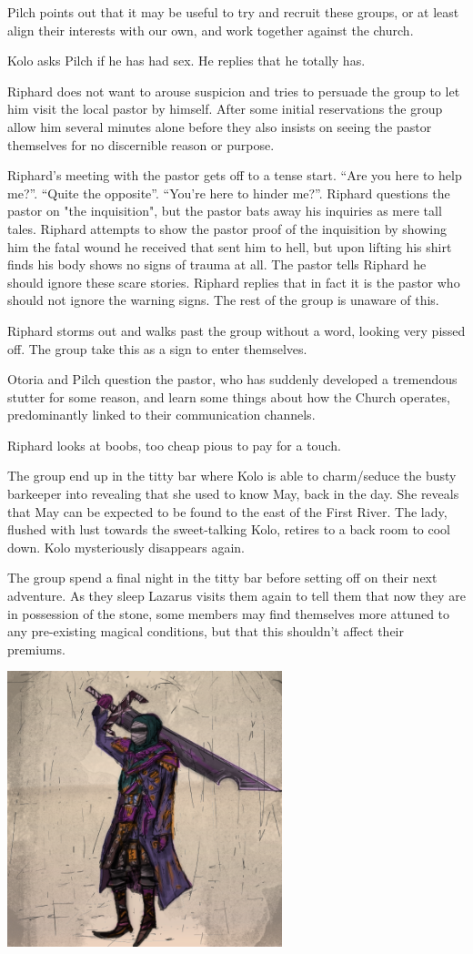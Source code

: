 Pilch points out that it may be useful to try and recruit these groups, or at least align their interests with our own, and work together against the church.

Kolo asks Pilch if he has had sex. He replies that he totally has.

Riphard does not want to arouse suspicion and tries to persuade the group to let him visit the local pastor by himself. After some initial reservations the group allow him several minutes alone before they also insists on seeing the pastor themselves for no discernible reason or purpose.

Riphard's meeting with the pastor gets off to a tense start. “Are you here to help me?”. “Quite the opposite”. “You’re here to hinder me?”. Riphard questions the pastor on "the inquisition", but the pastor bats away his inquiries as mere tall tales. Riphard attempts to show the pastor proof of the inquisition by showing him the fatal wound he received that sent him to hell, but upon lifting his shirt finds his body shows no signs of trauma at all. The pastor tells Riphard he should ignore these scare stories. Riphard replies that in fact it is the pastor who should not ignore the warning signs. The rest of the group is unaware of this.

Riphard storms out and walks past the group without a word, looking very pissed off. The group take this as a sign to enter themselves.

Otoria and Pilch question the pastor, who has suddenly developed a tremendous stutter for some reason, and learn some things about how the Church operates, predominantly linked to their communication channels.

Riphard looks at boobs, too cheap pious to pay for a touch.

The group end up in the titty bar where Kolo is able to charm/seduce the busty barkeeper into revealing that she used to know May, back in the day. She reveals that May can be expected to be found to the east of the First River. The lady, flushed with lust towards the sweet-talking Kolo, retires to a back room to cool down. Kolo mysteriously disappears again.

The group spend a final night in the titty bar before setting off on their next adventure. As they sleep Lazarus visits them again to tell them that now they are in possession of the stone, some members may find themselves more attuned to any pre-existing magical conditions, but that this shouldn't affect their premiums.

\begin{center}
\includegraphics[width=80mm]{./img/otoria1.png}
\begin{figure}[h]
\end{figure}
\end{center}

\clearpage